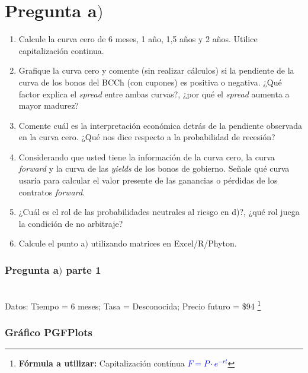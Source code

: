 \documentclass{beamer}
\begin{document}
\section{Pregunta a$)$}
  \begin{frame} 
  
\begin{enumerate}[label=\textbf{\alph*)}]
  \small
  \item Calcule la curva cero de 6 meses, 1 año, 1,5 años y 2 años.
   Utilice capitalización continua.
  
  \item Grafique la curva cero y comente (sin realizar cálculos) si 
  la pendiente de la curva de los bonos del BCCh (con cupones) es 
  positiva o negativa. ¿Qué factor explica el \textit{spread} entre 
  ambas curvas?, ¿por qué el \textit{spread} aumenta a mayor madurez?
  
  \item Comente cuál es la interpretación económica detrás de la 
  pendiente observada en la curva cero. ¿Qué nos dice respecto a 
  la probabilidad de recesión?
  
  \item Considerando que usted tiene la información de la curva cero, 
  la curva \textit{forward} y la curva de las \textit{yields} de los 
  bonos de gobierno. Señale qué curva usaría para calcular el valor 
  presente de las ganancias o pérdidas de los contratos \textit{forward}.
  
  \item ¿Cuál es el rol de las probabilidades neutrales al riesgo en d)?, 
  ¿qué rol juega la condición de no arbitraje?
  
  \item Calcule el punto a$)$ utilizando matrices en Excel/R/Phyton.
\end{enumerate}

  \end{frame}  

\begin{frame}

    \frametitle{Pregunta a$)$ parte 1}
    \LARGE {}\\[1em]
    Datos: \footnotesize {Tiempo = 6 meses; Tasa = Desconocida; Precio futuro = \$94}
    \footnote{\textbf{Fórmula a utilizar:} Capitalización contínua
    \textcolor{blue}{$F = P \cdot e^{-rt}$}}

\end{frame}
\begin{frame}
  \frametitle{Gráfico PGFPlots}
  \end{frame}
\end{document}
